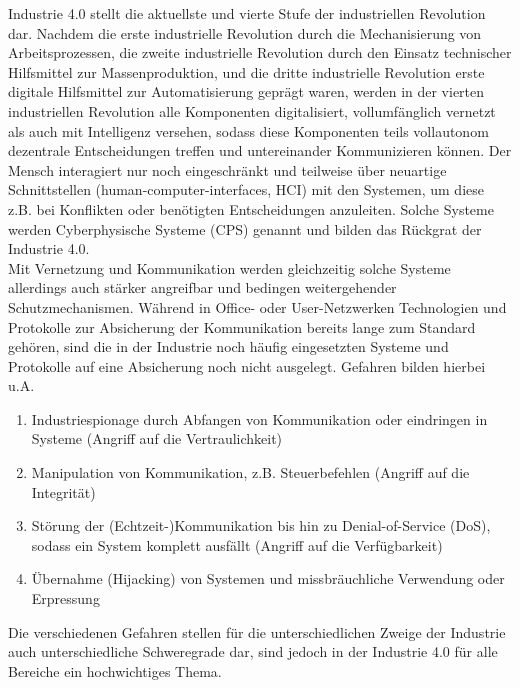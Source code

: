 \documentclass[conference]{IEEEtran}
\begin{document}
Industrie 4.0 stellt die aktuellste und vierte Stufe der industriellen Revolution dar. Nachdem die erste industrielle Revolution durch die Mechanisierung von Arbeitsprozessen, die zweite industrielle Revolution durch den Einsatz technischer Hilfsmittel zur Massenproduktion, und die dritte industrielle Revolution erste digitale Hilfsmittel zur Automatisierung geprägt waren, werden in der vierten industriellen Revolution alle Komponenten digitalisiert, vollumfänglich vernetzt als auch mit Intelligenz versehen, sodass diese Komponenten teils vollautonom dezentrale Entscheidungen treffen und untereinander Kommunizieren können. Der Mensch interagiert nur noch eingeschränkt und teilweise über neuartige Schnittstellen (human-computer-interfaces, HCI) mit den Systemen, um diese z.B. bei Konflikten oder benötigten Entscheidungen anzuleiten. Solche Systeme werden Cyberphysische Systeme (CPS) genannt und bilden das Rückgrat der Industrie 4.0.\\

Mit Vernetzung und Kommunikation werden gleichzeitig solche Systeme allerdings auch stärker angreifbar und bedingen weitergehender Schutzmechanismen. Während in Office- oder User-Netzwerken
Technologien und Protokolle zur Absicherung der Kommunikation bereits lange zum Standard gehören, sind die in der Industrie noch häufig eingesetzten Systeme und Protokolle auf eine Absicherung noch nicht ausgelegt. Gefahren bilden hierbei u.A.

\vspace{.5em}

\renewcommand{\labelenumi}{\alph{enumi})}
\begin{enumerate}
	\item Industriespionage durch Abfangen von Kommunikation oder eindringen in Systeme (Angriff auf die Vertraulichkeit)
	\item Manipulation von Kommunikation, z.B. Steuerbefehlen (Angriff auf die Integrität)
	\item Störung der (Echtzeit-)Kommunikation bis hin zu Denial-of-Service (DoS), sodass ein System komplett ausfällt (Angriff auf die Verfügbarkeit)
	\item Übernahme (Hijacking) von Systemen und missbräuchliche Verwendung oder Erpressung
\end{enumerate}

\vspace{.5em}

Die verschiedenen Gefahren stellen für die unterschiedlichen Zweige der Industrie auch unterschiedliche Schweregrade dar, sind jedoch in der Industrie 4.0 für alle Bereiche ein hochwichtiges Thema.\\
\end{document}
